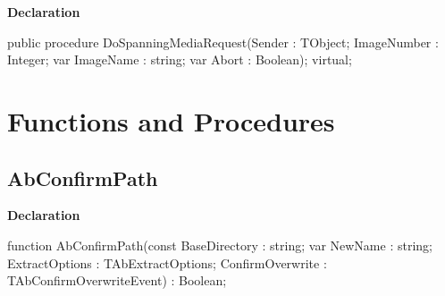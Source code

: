 \documentclass{report}
\newif\ifpdf
\begin{document}
\label{AbArcTyp.TAbArchive-DoSpanningMediaRequest}
\begin{list}{}{
\setlength{\itemindent}{0cm}
\setlength{\listparindent}{0cm}
\setlength{\leftmargin}{\evensidemargin}
\addtolength{\leftmargin}{\tmplength}
\settowidth{\labelsep}{X}
\addtolength{\leftmargin}{\labelsep}
\setlength{\labelwidth}{\tmplength}
}
\item[\textbf{Declaration}\hfill]
\ifpdf
\begin{flushleft}
\fi
\begin{ttfamily}
public procedure DoSpanningMediaRequest(Sender : TObject; ImageNumber : Integer; var ImageName : string; var Abort : Boolean); virtual;\end{ttfamily}

\ifpdf
\end{flushleft}
\fi

\end{list}
\section{Functions and Procedures}
\ifpdf
\subsection*{\large{\textbf{AbConfirmPath}}\normalsize\hspace{1ex}\hrulefill}
\else
\subsection*{AbConfirmPath}
\fi
\label{AbArcTyp-AbConfirmPath}
\begin{list}{}{
\setlength{\itemindent}{0cm}
\setlength{\listparindent}{0cm}
\setlength{\leftmargin}{\evensidemargin}
\addtolength{\leftmargin}{\tmplength}
\settowidth{\labelsep}{X}
\addtolength{\leftmargin}{\labelsep}
\setlength{\labelwidth}{\tmplength}
}
\item[\textbf{Declaration}\hfill]
\ifpdf
\begin{flushleft}
\fi
\begin{ttfamily}
function AbConfirmPath(const BaseDirectory : string; var NewName : string; ExtractOptions : TAbExtractOptions; ConfirmOverwrite : TAbConfirmOverwriteEvent) : Boolean;\end{ttfamily}

\ifpdf
\end{flushleft}
\fi

\end{list}
\end{document}
